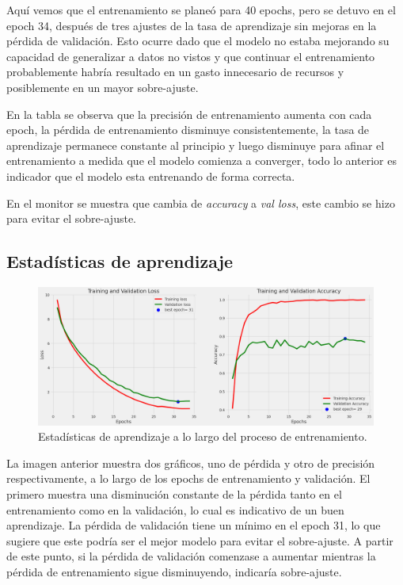   Aquí vemos que el entrenamiento se planeó para 40 epochs, pero se detuvo en el epoch 34, después de tres ajustes de la tasa de aprendizaje sin mejoras en la pérdida de validación. Esto ocurre dado que el modelo no estaba mejorando su capacidad de generalizar a datos no vistos y que continuar el entrenamiento probablemente habría resultado en un gasto innecesario de recursos y posiblemente en un mayor sobre-ajuste. 
  
  En la tabla se observa que la precisión de entrenamiento aumenta con cada epoch, la pérdida de entrenamiento disminuye consistentemente, la tasa de aprendizaje permanece constante al principio y luego disminuye para afinar el entrenamiento a medida que el modelo comienza a converger, todo lo anterior es indicador que el modelo esta entrenando de forma correcta.

  En el monitor se muestra que cambia de \textit{accuracy} a \textit{val loss}, este cambio se hizo para evitar el sobre-ajuste.

\subsection*{Estadísticas de aprendizaje}\label{sub:learning_statistics_p1}
		\begin{figure}[ht]%
      \begin{center}
      \includegraphics[width=1\textwidth]{./Graphics/training&validation_p1.png}
      \caption{Estadísticas de aprendizaje a lo largo del proceso de entrenamiento.\label{fig:training_validation_loss}}
      \end{center}
		\end{figure}
  
La imagen anterior muestra dos gráficos, uno de pérdida y otro de precisión respectivamente, a lo largo de los epochs de entrenamiento y validación. El primero muestra una disminución constante de la pérdida tanto en el entrenamiento como en la validación, lo cual es indicativo de un buen aprendizaje. La pérdida de validación tiene un mínimo en el epoch 31, lo que sugiere que este podría ser el mejor modelo para evitar el sobre-ajuste. A partir de este punto, si la pérdida de validación comenzase a aumentar mientras la pérdida de entrenamiento sigue disminuyendo, indicaría sobre-ajuste.

